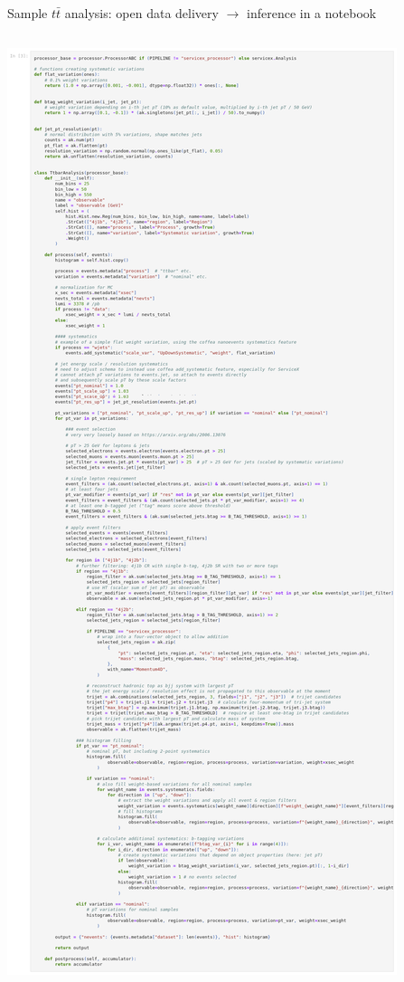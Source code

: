 \documentclass[aspectratio=169]{beamer}
\begin{document}
\begin{frame}{Sample $t\bar{t}$ analysis: open data delivery $\to$ inference in a notebook}
\vspace{0.25 cm}
\begin{columns}
\includegraphics[width=\linewidth]{PLOTS/gac-ttbar-analysis-code.png}


\end{columns}
\end{frame}
\end{document}
